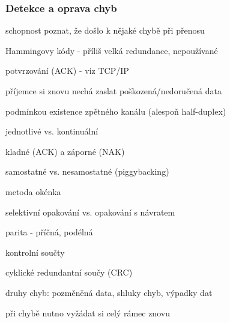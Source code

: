 \subsubsection*{Detekce a oprava chyb}
\begin{pitemize}
	\item schopnost poznat, že došlo k nějaké chybě při přenosu
	\item Hammingovy kódy - příliš velká redundance, nepoužívané
	\item potvrzování (ACK) - viz TCP/IP
		\begin{pitemize}
			\item příjemce si znovu nechá zaslat poškozená/nedoručená data
			\item podmínkou existence zpětného kanálu (alespoň half-duplex)
			\item jednotlivé vs. kontinuální
			\item kladné (ACK) a záporné (NAK)
			\item samostatné vs. nesamostatné (piggybacking)
			\item metoda okénka
			\item selektivní opakování vs. opakování s návratem 
		\end{pitemize}
	\item parita - příčná, podélná
	\item kontrolní součty
	\item cyklické redundantní součy (CRC)
	\item druhy chyb: pozměněná data, shluky chyb, výpadky dat
	\item při chybě nutno vyžádat si celý rámec znovu 
\end{pitemize}